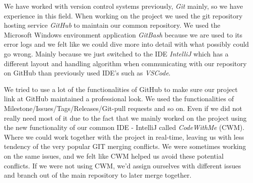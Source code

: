 \documentclass[main.tex]{subfiles}
\begin{document}
We have worked with version control systems previously, \textit{Git} mainly, so we have experience in this field. When working on the project we used the git repository hosting service \textit{GitHub} to maintain our common repository. We used the Microsoft Windows environment application \textit{GitBash} because we are used to its error logs and we felt like we could dive more into detail with what possibly could go wrong. Mainly because we just switched to the IDE \textit{IntelliJ} which has a different layout and handling algorithm when communicating with our repository on GitHub than previously used IDE’s such as \textit{VSCode}.

We tried to use a lot of the functionalities of GitHub to make sure our project link at GitHub maintained a professional look. We used the functionalities of Milestone/Issues/Tags/Releases/Git-pull requests and so on. Even if we did not really need most of it due to the fact that we mainly worked on the project using the new functionality of our common IDE - IntelliJ called \textit{CodeWithMe} (CWM). Where we could work together with the project in real-time, leaving us with less tendency of the very popular GIT merging conflicts. We were sometimes working on the same issues, and we felt like CWM helped us avoid these potential conflicts.
If we were not using CWM, we’d assign ourselves with different issues and branch out of the main repository to later merge together.
\end{document}
